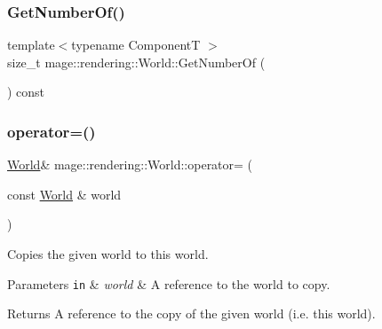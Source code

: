 \hypertarget{classmage_1_1rendering_1_1_world_a3f5ff2ff451a90af7071bddf9d226618}{}\label{classmage_1_1rendering_1_1_world_a3f5ff2ff451a90af7071bddf9d226618} 
\subsubsection{\texorpdfstring{Get\+Number\+Of()}{GetNumberOf()}}
{\footnotesize\ttfamily template$<$typename ComponentT $>$ \\
size\+\_\+t mage\+::rendering\+::\+World\+::\+Get\+Number\+Of (\begin{DoxyParamCaption}{ }\end{DoxyParamCaption}) const\hspace{0.3cm}{\ttfamily [noexcept]}}

\hypertarget{classmage_1_1rendering_1_1_world_aff83cf89dc28c141ca7b7a0cbc28e2ae}{}\label{classmage_1_1rendering_1_1_world_aff83cf89dc28c141ca7b7a0cbc28e2ae} 
\subsubsection{\texorpdfstring{operator=()}{operator=()}\hspace{0.1cm}{\footnotesize\ttfamily [1/2]}}
{\footnotesize\ttfamily \hyperlink{classmage_1_1rendering_1_1_world}{World}\& mage\+::rendering\+::\+World\+::operator= (\begin{DoxyParamCaption}\item[{const \hyperlink{classmage_1_1rendering_1_1_world}{World} \&}]{world }\end{DoxyParamCaption})\hspace{0.3cm}{\ttfamily [delete]}}

Copies the given world to this world.


\begin{DoxyParams}[1]{Parameters}
\mbox{\tt in}  & {\em world} & A reference to the world to copy. \\
\hline
\end{DoxyParams}
\begin{DoxyReturn}{Returns}
A reference to the copy of the given world (i.\+e. this world). 
\end{DoxyReturn}
\hypertarget{classmage_1_1rendering_1_1_world_a7f44f10905070997553a7c7ad90ddcb2}{}\label{classmage_1_1rendering_1_1_world_a7f44f10905070997553a7c7ad90ddcb2} 
